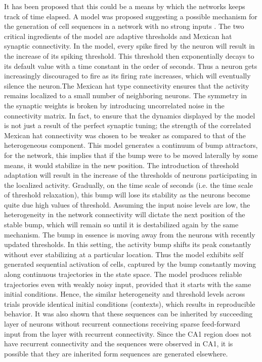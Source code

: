 It has been proposed that this could be a means by which the networks keeps track of time elapsed. A model was proposed suggesting a possible mechanism for the generation of cell sequences in a network with no strong inputs \cite{Itskov2011a}. The two critical ingredients of the model are adaptive thresholds and Mexican hat synaptic connectivity. In the model, every spike fired by the neuron will result in the increase of its spiking threshold. This threshold then exponentially decays to its default value with a time constant in the order of seconds. Thus a neuron gets increasingly discouraged to fire as its firing rate increases, which will eventually silence the neuron.The Mexican hat type connectivity ensures that the activity remains localized to a small number of neighboring neurons. The symmetry in the synaptic weights is broken by introducing uncorrelated noise in the connectivity matrix. In fact, to ensure that the dynamics displayed by the model is not just a result of the perfect synaptic tuning; the strength of the correlated Mexican hat connectivity was chosen to be weaker as compared to that of the heterogeneous component. This model generates a continuum of bump attractors, for the network, this implies that if the bump were to be moved laterally by some means, it would stabilize in the new position.  The introduction of threshold adaptation will result in the increase of the thresholds of neurons participating in the localized activity. Gradually, on the time scale of seconds (i.e. the time scale of threshold relaxation), this bump will lose its stability as the neurons become quite due high values of threshold. Assuming the input noise levels are low, the heterogeneity in the network connectivity will dictate the next position of the stable bump, which will remain so until it is destabilized again by the same mechanism. The bump in essence is moving away from the neurons with recently updated thresholds. In this setting, the activity bump shifts its peak constantly without ever stabilizing at a particular location. Thus the model exhibits self generated sequential activation of cells, captured by the bump constantly moving along continuous trajectories in the state space. The model produces reliable trajectories even with weakly noisy input, provided that it starts with the same initial conditions. Hence, the similar heterogeneity and threshold levels across trials provide identical initial conditions (contexts), which results in reproducible behavior. It was also shown that these sequences can be inherited by succeeding layer of neurons without recurrent connections receiving sparse feed-forward input from the layer with recurrent connectivity. Since the CA1 region does not have recurrent connectivity and the sequences were observed in CA1, it is possible that they are inherited form sequences are generated elsewhere.\\

